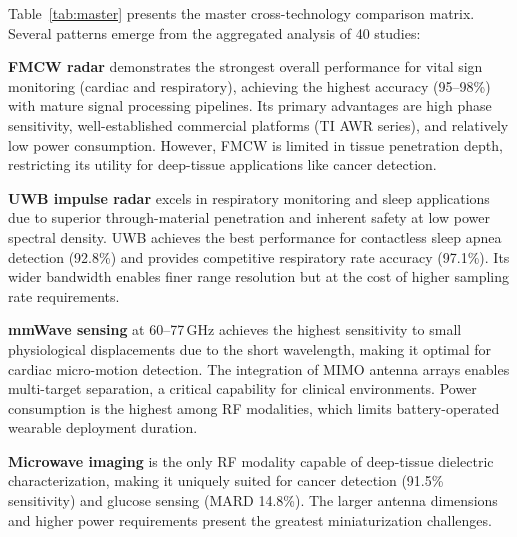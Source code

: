 \documentclass[journal,twoside]{IEEEtran}
\begin{document}
Table~\ref{tab:master} presents the master cross-technology comparison matrix. Several patterns emerge from the aggregated analysis of 40 studies:

\textbf{FMCW radar} demonstrates the strongest overall performance for vital sign monitoring (cardiac and respiratory), achieving the highest accuracy (95--98\%) with mature signal processing pipelines. Its primary advantages are high phase sensitivity, well-established commercial platforms (TI AWR series), and relatively low power consumption. However, FMCW is limited in tissue penetration depth, restricting its utility for deep-tissue applications like cancer detection.

\textbf{UWB impulse radar} excels in respiratory monitoring and sleep applications due to superior through-material penetration and inherent safety at low power spectral density. UWB achieves the best performance for contactless sleep apnea detection (92.8\%) and provides competitive respiratory rate accuracy (97.1\%). Its wider bandwidth enables finer range resolution but at the cost of higher sampling rate requirements.

\textbf{mmWave sensing} at 60--77\,GHz achieves the highest sensitivity to small physiological displacements due to the short wavelength, making it optimal for cardiac micro-motion detection. The integration of MIMO antenna arrays enables multi-target separation, a critical capability for clinical environments. Power consumption is the highest among RF modalities, which limits battery-operated wearable deployment duration.

\textbf{Microwave imaging} is the only RF modality capable of deep-tissue dielectric characterization, making it uniquely suited for cancer detection (91.5\% sensitivity) and glucose sensing (MARD 14.8\%). The larger antenna dimensions and higher power requirements present the greatest miniaturization challenges.
\end{document}
